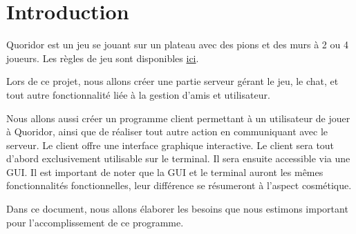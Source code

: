 \section{Introduction}

Quoridor est un jeu se jouant sur un plateau avec des pions et des murs à 2 ou 4 joueurs.
Les règles de jeu sont disponibles \href{http://www.gigamic.com/files/catalog/products/rules/quoridor-classic-fr.pdf}{ici}.

Lors de ce projet, nous allons créer une partie serveur gérant le jeu, le chat, et tout autre fonctionnalité liée à la gestion d'amis et utilisateur.

Nous allons aussi créer un programme client permettant à un utilisateur de jouer à Quoridor, ainsi que de réaliser tout autre action en communiquant avec le serveur. Le client offre une interface graphique interactive. Le client sera tout d'abord exclusivement utilisable sur le terminal. Il sera ensuite accessible via une GUI. Il est important de noter que la GUI et le terminal auront les mêmes fonctionnalités fonctionnelles, leur différence se résumeront à l'aspect cosmétique.

Dans ce document, nous allons élaborer les besoins que nous estimons important pour l'accomplissement de ce programme.